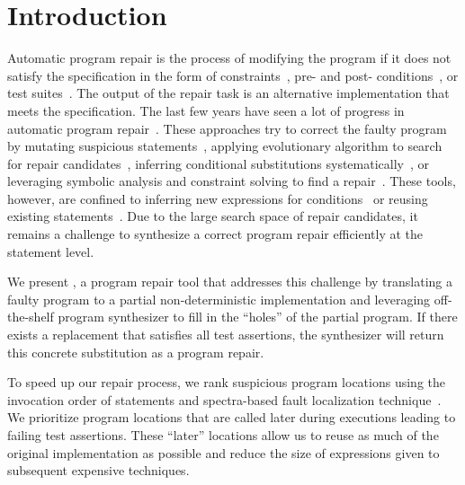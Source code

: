 \section{Introduction}


%
 Automatic program repair is the  process of modifying the program if it does not satisfy the specification in the form of constraints~\cite{divya:tacas11},  pre- and post- conditions~\cite{autofix:tse14}, or test suites~\cite{par:icse13, angelix:icse16}.  The output of the repair task is an alternative implementation that meets the specification. The last few years have seen a lot of progress in automatic program repair~\cite{genprog:tse12, Debroy:icst10, spr:fse15}.  These approaches try to correct the faulty program by mutating suspicious statements~\cite{Debroy:icst10},   applying evolutionary algorithm to search for repair candidates~\cite{genprog:tse12}, inferring conditional substitutions systematically~\cite{spr:fse15}, or leveraging  symbolic analysis and constraint solving to find a repair~\cite{semfix:icse13}. %
These tools, however,  
are confined to inferring new expressions for conditions~\cite{spr:fse15, nopol:cstva14} or reusing existing statements~\cite{genprog:tse12}.  Due to the large search space of repair candidates,  it remains a challenge to synthesize a correct program repair efficiently at the statement level.


We present \tool, a program repair tool that addresses this challenge by translating a faulty program to a partial non-deterministic implementation and leveraging off-the-shelf program synthesizer to fill in the ``holes'' of the partial program. If there exists a replacement that  satisfies all test assertions,  the synthesizer will return this concrete substitution as a program repair. 


To speed up our repair process, we rank suspicious program locations using the invocation order of  statements and  spectra-based fault localization technique~\cite{tarantula:ase05}.  We prioritize program locations that are called later during executions leading to failing test assertions. These ``later'' locations allow us   to reuse as much of the original implementation as possible and reduce the size of expressions given to subsequent expensive techniques.  


